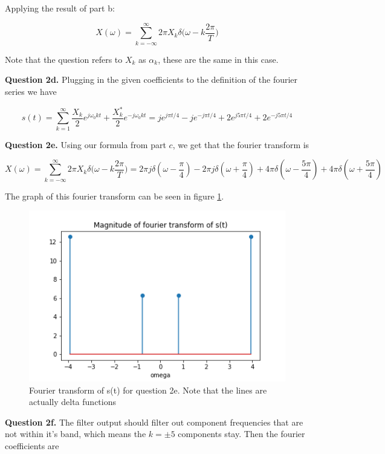 \documentclass[letterpaper, reqno,11pt]{article}
\begin{document}
Applying the result of part b: 

\[
    X(\omega) = \sum_{k=-\infty}^\infty 2\pi X_k\delta\bigg(\omega-k\frac{2\pi}T\bigg)    
\]

Note that the question refers to $X_k$ as $\alpha_k$, these are the same in this case. 

{\noindent\bf Question 2d.} Plugging in the given coefficients to the definition of the fourier series we have 

\[
    s(t) = \sum_{k=1}^\infty \frac{X_k}2 e^{j\omega_0 kt}+\frac{X_k^*}2 e^{-j\omega_0 kt}=je^{j\pi t/4}-je^{-j\pi t/4}+2e^{j5\pi t/4}+2e^{-j5\pi t/4}
\]


{\noindent\bf Question 2e.} Using our formula from part $c$, we get that the fourier transform is 

\[
    X(\omega) = \sum_{k=-\infty}^\infty 2\pi X_k\delta\bigg(\omega-k\frac{2\pi}T\bigg)=2\pi j\delta(\omega-\frac\pi4)-2\pi j\delta(\omega+\frac\pi4)+4\pi\delta(\omega-\frac{5\pi}{4})+4\pi\delta(\omega+\frac{5\pi}{4})
\]

The graph of this fourier transform can be seen in figure \ref{fig:q2e}. 

\begin{figure}[htbp]
\centering
\includegraphics[width=\textwidth]{q2e}
\caption{Fourier transform of s(t) for question 2e. Note that the lines are actually delta functions}
\label{fig:q2e}
\end{figure}

{\noindent\bf Question 2f.} The filter output should filter out component frequencies that are not within it's band, which means the $k=\pm5$ components stay. Then the fourier coefficients are 
\end{document}
